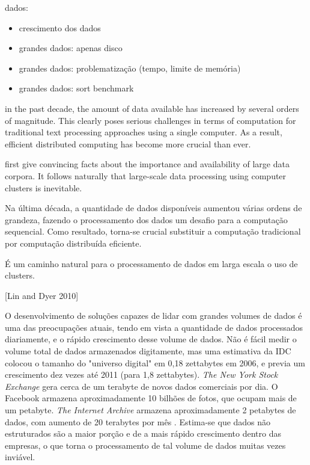 dados: 
\begin{itemize}
\item crescimento dos dados
\item grandes dados: apenas disco
\item grandes dados: problematização (tempo, limite de memória)
\item grandes dados: sort benchmark
\end{itemize}

 in the past decade, the amount of data available has increased by several orders of magnitude. This clearly poses serious challenges in terms of computation for traditional text processing approaches using a single computer. As a result, efficient distributed computing has become more crucial than ever.
 
 first give convincing facts about the importance and availability of large data corpora. It follows naturally that large-scale data processing using computer clusters is inevitable.
 
 

Na última década, a quantidade de dados disponíveis aumentou várias ordens de grandeza, fazendo o processamento dos dados um desafio para a computação sequencial. Como resultado, torna-se crucial substituir a computação tradicional por computação distribuída eficiente. 

É um caminho natural para o processamento de dados em larga escala o uso de clusters.
  
[Lin and Dyer 2010]

O desenvolvimento de soluções capazes de lidar com grandes volumes de dados é uma das preocupações atuais, tendo em vista a quantidade de dados processados diariamente, e o rápido crescimento desse volume de dados.
Não é fácil medir o volume total de dados armazenados digitamente, mas uma estimativa da IDC colocou o tamanho do "universo digital" em 0,18 zettabytes em 2006, e previa um crescimento dez vezes até 2011 (para 1,8 zettabytes).
 \textit{The New York Stock Exchange} gera cerca de um terabyte de novos dados comerciais por dia. O Facebook armazena aproximadamente 10 bilhões de fotos, que ocupam mais de um petabyte. \textit{The Internet Archive} armazena aproximadamente 2 petabytes de dados, com aumento de 20 terabytes por mês
\citep{Hadoop:2010}. Estima-se que dados não estruturados são a maior porção e de a mais rápido crescimento dentro das empresas, o que torna o processamento de tal volume de dados muitas vezes inviável.
